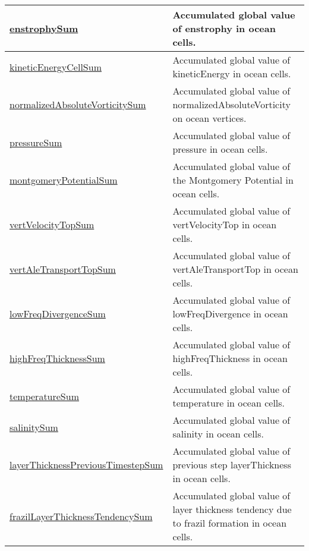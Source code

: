 {\begin{center}
\begin{longtable}{| p{2.0in} | p{4.0in} |}
    \hline
    \hyperref[subsec:var_sec_globalStatsAM_enstrophySum]{enstrophySum} & Accumulated global value of enstrophy in ocean cells. \\
    \hline
    \hyperref[subsec:var_sec_globalStatsAM_kineticEnergyCellSum]{kineticEnergyCellSum} & Accumulated global value of kineticEnergy in ocean cells. \\
    \hline
    \hyperref[subsec:var_sec_globalStatsAM_normalizedAbsoluteVorticitySum]{normalizedAbsoluteVorticitySum} & Accumulated global value of normalizedAbsoluteVorticity on ocean vertices. \\
    \hline
    \hyperref[subsec:var_sec_globalStatsAM_pressureSum]{pressureSum} & Accumulated global value of pressure in ocean cells. \\
    \hline
    \hyperref[subsec:var_sec_globalStatsAM_montgomeryPotentialSum]{montgomeryPotentialSum} & Accumulated global value of the Montgomery Potential in ocean cells. \\
    \hline
    \hyperref[subsec:var_sec_globalStatsAM_vertVelocityTopSum]{vertVelocityTopSum} & Accumulated global value of vertVelocityTop in ocean cells. \\
    \hline
    \hyperref[subsec:var_sec_globalStatsAM_vertAleTransportTopSum]{vertAleTransportTopSum} & Accumulated global value of vertAleTransportTop in ocean cells. \\
    \hline
    \hyperref[subsec:var_sec_globalStatsAM_lowFreqDivergenceSum]{lowFreqDivergenceSum} & Accumulated global value of lowFreqDivergence in ocean cells. \\
    \hline
    \hyperref[subsec:var_sec_globalStatsAM_highFreqThicknessSum]{highFreqThicknessSum} & Accumulated global value of highFreqThickness in ocean cells. \\
    \hline
    \hyperref[subsec:var_sec_globalStatsAM_temperatureSum]{temperatureSum} & Accumulated global value of temperature in ocean cells. \\
    \hline
    \hyperref[subsec:var_sec_globalStatsAM_salinitySum]{salinitySum} & Accumulated global value of salinity in ocean cells. \\
    \hline
    \hyperref[subsec:var_sec_globalStatsAM_layerThicknessPreviousTimestepSum]{layerThicknessPreviousTimestep\-Sum} & Accumulated global value of previous step layerThickness in ocean cells. \\
    \hline
    \hyperref[subsec:var_sec_globalStatsAM_frazilLayerThicknessTendencySum]{frazilLayerThicknessTendency\-Sum} & Accumulated global value of layer thickness tendency due to frazil formation in ocean cells. \\

\end{longtable}
\end{center}}
